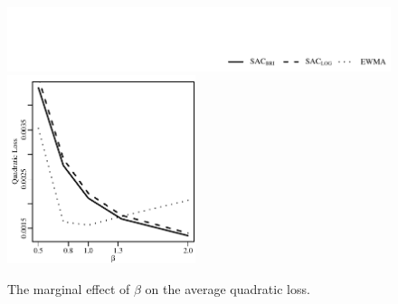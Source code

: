 \documentclass[aoas, preprint]{imsart}
\numberwithin{equation}{section}
\theoremstyle{plain}
\begin{document}
\begin{figure}[h!]
\vspace{-5em}
\hspace{-25em}	\includegraphics{Figures/LegendSynthetic} %
 \includegraphics[width= 0.49\textwidth]{Figures/SyntheticBeta}
\caption[Optional caption for list of figures]{
The marginal effect of $\beta$ on the average quadratic loss.}
\label{Synthetic}
\end{figure}


\end{document}
